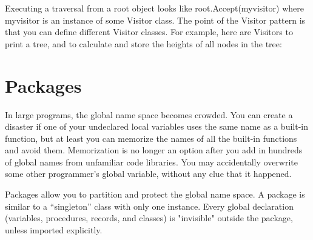 Executing a traversal from a root object looks like
\textsf{root.Accept(myvisitor)} where \textsf{myvisitor} is an instance
of some \textsf{Visitor} class. The point of the Visitor pattern is
that you can define different Visitor classes. For example, here are
Visitors to print a tree, and to calculate and store the heights of all
nodes in the tree:


\section{Packages}

In large programs, the global name space becomes crowded. You can create
a disaster if one of your undeclared local variables uses the same name
as a built-in function, but at least you can memorize the names of all
the built-in functions and avoid them. Memorization is no longer an
option after you add in hundreds of global names from unfamiliar code
libraries. You may accidentally overwrite some other
programmer's global variable, without
any clue that it happened.

Packages allow you to partition and protect the global name space. A package is similar to a
{\textquotedblleft}singleton{\textquotedblright} class with only one
instance. Every global declaration (variables, procedures, records, and
classes) is "invisible" outside the
package, unless imported explicitly.

